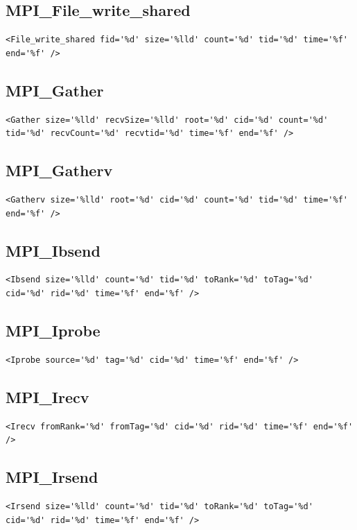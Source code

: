 \documentclass[a4paper,12pt,pdftex]{scrartcl}
\begin{document}
\subsection{MPI\_File\_write\_shared}
\begin{lstlisting}
<File_write_shared fid='%d' size='%lld' count='%d' tid='%d' time='%f' end='%f' />
\end{lstlisting}

\subsection{MPI\_Gather}
\begin{lstlisting}
<Gather size='%lld' recvSize='%lld' root='%d' cid='%d' count='%d' tid='%d' recvCount='%d' recvtid='%d' time='%f' end='%f' />
\end{lstlisting}

\subsection{MPI\_Gatherv}
\begin{lstlisting}
<Gatherv size='%lld' root='%d' cid='%d' count='%d' tid='%d' time='%f' end='%f' />
\end{lstlisting}

\subsection{MPI\_Ibsend}
\begin{lstlisting}
<Ibsend size='%lld' count='%d' tid='%d' toRank='%d' toTag='%d' cid='%d' rid='%d' time='%f' end='%f' />
\end{lstlisting}

\subsection{MPI\_Iprobe}
\begin{lstlisting}
<Iprobe source='%d' tag='%d' cid='%d' time='%f' end='%f' />
\end{lstlisting}

\subsection{MPI\_Irecv}
\begin{lstlisting}
<Irecv fromRank='%d' fromTag='%d' cid='%d' rid='%d' time='%f' end='%f' />
\end{lstlisting}

\subsection{MPI\_Irsend}
\begin{lstlisting}
<Irsend size='%lld' count='%d' tid='%d' toRank='%d' toTag='%d' cid='%d' rid='%d' time='%f' end='%f' />
\end{lstlisting}
\end{document}
